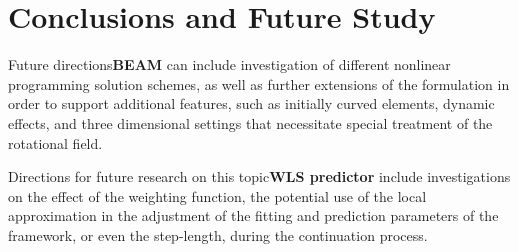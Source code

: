 \chapter{Conclusions and Future Study}

 Future directions\textbf{BEAM} 
can include investigation of different nonlinear programming solution schemes,
as well as further extensions of the formulation in order to support additional 
features, such as initially curved elements, dynamic effects, and three 
dimensional settings that necessitate special treatment of the rotational field.



Directions
for future research on this topic\textbf{WLS predictor} include investigations 
on the effect of
the weighting function, the potential use of the local approximation in the
adjustment of the fitting and prediction parameters of the framework, or even
the step-length, during the continuation process.